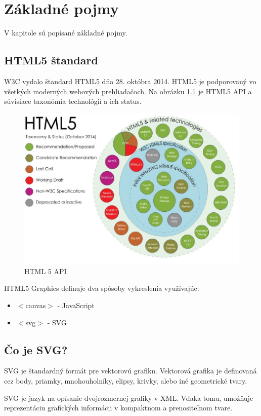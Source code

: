 \chapter{Základné pojmy}
V kapitole sú popísané základné pojmy. 

\section{\acs{HTML}5 štandard}

\ac{W3C} vydalo štandard \acs{HTML}5 dňa 28. októbra 2014. 
HTML5 je podporovaný vo všetkých moderných webových prehliadačoch. 
Na obrázku \ref{fig:obrazokHTML} je HTML5 \acs{API} a súvisiace taxonómia technológií a ich status. 

\begin{center}
	\begin{figure}[hp]
\centering
\includegraphics[width=0.7\linewidth]{obrazky/obrazokHTML}
\caption{HTML 5 API}
\label{fig:obrazokHTML}
\end{figure}
\end{center}

HTML5 Graphics definuje dva spôsoby vykreslenia využívajúc: 
\begin{itemize}
	\item $<$canvas$>$ - JavaScript
	\item $<$svg$>$ - SVG
\end{itemize}


\section{Čo je SVG?}
\ac{SVG} je štandardný formát pre vektorovú grafiku. Vektorová grafika je definovaná cez body, priamky, mnohouholníky, elipsy, krivky, alebo iné geometrické tvary.  

\acs{SVG} je jazyk na opísanie dvojrozmernej grafiky v   \ac*{XML}. Vďaka tomu, umožňuje reprezentáciu grafických informácii v kompaktnom a prenositeľnom tvare.

